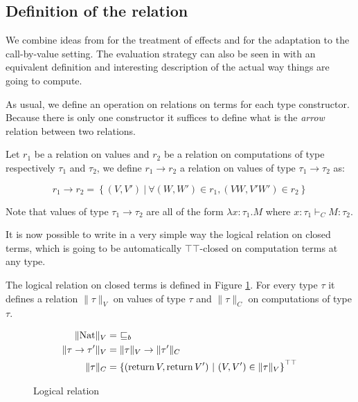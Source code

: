 \subsection{Definition of the relation}

We combine ideas from \cite{gom} 
for the treatment of effects and 
\cite{pitts1998existential} for the 
adaptation to the call-by-value setting.
The evaluation strategy can also be 
seen in \cite{dagand2015normalization}
with an equivalent definition and 
interesting description of the
actual way things are going to compute.

As usual, we define an operation on relations on terms 
for each type constructor. Because there is only one 
constructor it suffices to define what is the \emph{arrow}
relation between two relations.

\begin{adefinition}
    Let $r_1$ be a relation on values 
    and $r_2$ be a relation on computations 
    of type respectively $\tau_1$ and $\tau_2$, we define 
    $r_1 \to r_2$ a relation on 
    values of type $\tau_1 \to \tau_2$ as:

    \begin{equation*}
        r_1 \to r_2 = 
        \left\{ 
            (V,V')  
            ~|~
            \forall (W,W') \in r_1, 
            (VW, V'W') \in r_2 
        \right\}
    \end{equation*}

    Note that values of type $\tau_1 \to \tau_2$
    are all of the form $\lambda x:\tau_1. M$
    where $x:\tau_1 \vdash_C M : \tau_2$.
\end{adefinition}


It is now possible to write in a very simple way the logical 
relation on closed terms, which is going to be automatically $\top\top$-closed 
on computation terms at any type.

\begin{adefinition}
    The logical relation on closed terms is defined in
    Figure \ref{fig:logicalrel}. For every type 
    $\tau$ it defines a relation $\| \tau \|_V$ 
    on values of type $\tau$ and $\| \tau \|_C$ 
    on computations of type $\tau$.
\end{adefinition}

\begin{figure}[h]
    \begin{align*}
        \| \textnormal{Nat} \|_V &= \  \sqsubseteq_b \\
        \| \tau \to \tau' \|_V &= \| \tau \|_V \to \| \tau' \|_C \\
        \| \tau \|_C &= \left\{ (\operatorname{return} V, \operatorname{return} V') ~|~ (V,V') \in \|\tau\|_V
        \right\}^{\top\top}
    \end{align*}
    \caption{Logical relation}
    \label{fig:logicalrel}
\end{figure}


